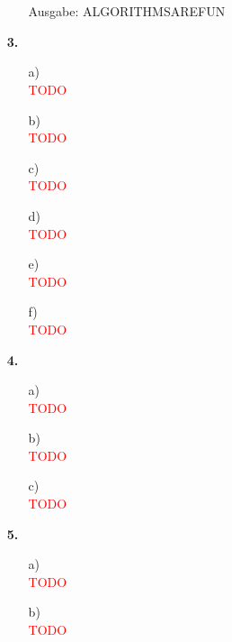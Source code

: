 \documentclass[a4paper,11pt,fleqn]{scrartcl}
\begin{document}
\begin{enumerate}
\begin{enumerate}
 \\ \\
				Ausgabe: ALGORITHMSAREFUN
		\end{enumerate}
		\item[\textbf{3.}]
		\begin{enumerate}
			\item[a)]\quad \\
				\textcolor{red}{TODO}
			\item[b)]\quad \\
				\textcolor{red}{TODO}
			\item[c)]\quad \\
				\textcolor{red}{TODO}
			\item[d)]\quad \\
				\textcolor{red}{TODO}
			\item[e)]\quad \\
				\textcolor{red}{TODO}
			\item[f)]\quad \\
				\textcolor{red}{TODO}
		\end{enumerate}
		\item[\textbf{4.}]
		\begin{enumerate}
			\item[a)]\quad \\
				\textcolor{red}{TODO}
			\item[b)]\quad \\
				\textcolor{red}{TODO}
			\item[c)]\quad \\
				\textcolor{red}{TODO}
		\end{enumerate}
		\item[\textbf{5.}]
		\begin{enumerate}
			\item[a)]\quad \\
				\textcolor{red}{TODO}
			\item[b)]\quad \\
				\textcolor{red}{TODO}
		\end{enumerate}
	\end{enumerate}
\end{document}
